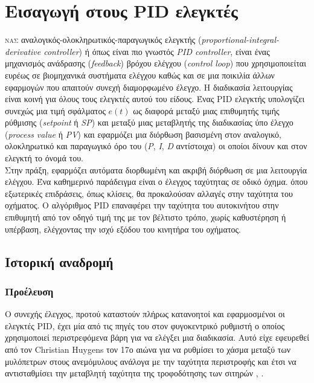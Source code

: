 


\section{Εισαγωγή στους PID ελεγκτές}

\lettrine[findent=2pt]{}{νας} αναλογικός-ολοκληρωτικός-παραγωγικός ελεγκτής (\emph{proportional-integral-derivative controller}) ή όπως είναι πιο γνωστός \emph{PID controller}, είναι ένας μηχανισμός ανάδρασης (\emph{feedback}) βρόχου ελέγχου (\emph{control loop}) που χρησιμοποιείται ευρέως σε βιομηχανικά συστήματα ελέγχου καθώς και σε μια ποικιλία άλλων εφαρμογών που απαιτούν συνεχή διαμορφωμένο έλεγχο. Η διαδικασία λειτουργίας είναι κοινή για όλους τους ελεγκτές αυτού του είδους. Ένας PID ελεγκτής υπολογίζει συνεχώς μια τιμή σφάλματος $e(t)$ ως διαφορά μεταξύ μιας επιθυμητής τιμής ρύθμισης (\emph{setpoint} ή \emph{SP}) και μεταξύ μιας μεταβλητής της διαδικασίας ύπο έλεγχο (\emph{process value} ή \emph{PV}) και εφαρμόζει μια διόρθωση βασισμένη στον αναλογικό, ολοκληρωτικό και παραγωγικό όρο του (\emph{P}, \emph{I}, \emph{D} αντίστοιχα) οι οποίοι δίνουν και στον ελεγκτή το όνομά του.\\
\linebreak
Στην πράξη, εφαρμόζει αυτόματα διορθωμένη και ακριβή διόρθωση σε μια λειτουργία ελέγχου. Ένα καθημερινό παράδειγμα είναι ο έλεγχος ταχύτητας σε οδικό όχημα. όπου εξωτερικές επιδράσεις, όπως κλίσεις, θα προκαλούσαν αλλαγές στην ταχύτητα του οχήματος. Ο αλγόριθμος PID επαναφέρει την ταχύτητα του αυτοκινήτου στην επιθυμητή από τον οδηγό τιμή της με τον βέλτιστο τρόπο, χωρίς καθυστέρηση ή υπέρβαση, ελέγχοντας την ισχύ εξόδου του κινητήρα του οχήματος.

\subsection{Ιστορική αναδρομή}

\subsubsection{Προέλευση}
Ο συνεχής έλεγχος, προτού καταστούν πλήρως κατανοητοί και εφαρμοσμένοι οι ελεγκτές PID, έχει μία από τις πηγές του στον φυγοκεντρικό ρυθμιστή ο οποίος χρησιμοποιεί περιστρεφόμενα βάρη για να ελέγξει μια διαδικασία. Αυτό είχε εφευρεθεί από τον Christian Huygens τον 17ο αιώνα για να ρυθμίσει το χάσμα μεταξύ των μυλόπετρων στους ανεμόμυλους ανάλογα με την ταχύτητα περιστροφής και έτσι να αντισταθμίσει την μεταβλητή ταχύτητα της τροφοδότησης των σιτηρών \cite{origin1}, \cite{origin2}.

